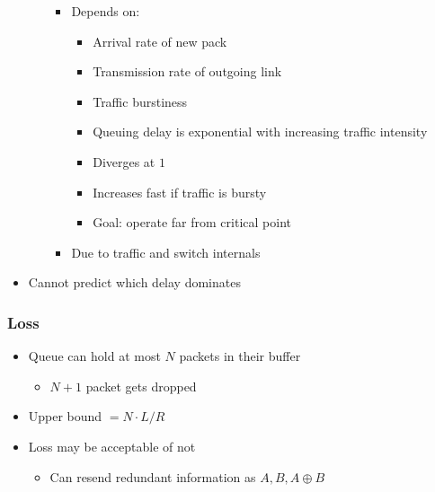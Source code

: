 \begin{itemize}
\begin{itemize}
\begin{itemize}
\begin{itemize}
                        \end{itemize}
                    \item Depends on:
                        \begin{itemize}
                            \item Arrival rate of new pack
                            \item Transmission rate of outgoing link
                            \item Traffic burstiness
                        \end{itemize}
                        \begin{itemize}
                             average packet arrival rate
                             transmission rate on outgoing link
                             fixed packet length
                             average bits arrival rate
                             traffic intensity
                            \item Queuing delay is exponential with increasing traffic intensity 
                            \item Diverges at $1$
                            \item Increases fast if traffic is bursty
                            \item Goal: operate far from critical point
                        \end{itemize}
                    \item Due to traffic and switch internals
                \end{itemize}
        \end{itemize}
    \item Cannot predict which delay dominates
\end{itemize}

\subsubsection{Loss}
\begin{itemize}
    \item Queue can hold at most $N$ packets in their buffer
        \begin{itemize}
            \item $N + 1$ packet gets dropped
        \end{itemize}
    \item Upper bound $= N \cdot L / R$
    \item Loss may be acceptable of not
        \begin{itemize}
            \item Can resend redundant information as $A, B, A \oplus B$
        \end{itemize}
\end{itemize}

